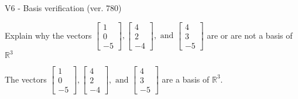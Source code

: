 \begin{exercise}
  \begin{exerciseTitle}V6 - Basis verification (ver. 780)\end{exerciseTitle}
  \begin{exerciseStatement}
    Explain why the vectors \(\left[\begin{array}{r}
1 \\
0 \\
-5
\end{array}\right] , \left[\begin{array}{r}
4 \\
2 \\
-4
\end{array}\right] , \text{ and } \left[\begin{array}{r}
4 \\
3 \\
-5
\end{array}\right]\) are or are not a basis of \(\mathbb{R}^3\)	


  \end{exerciseStatement}
  \begin{exerciseAnswer}
   The vectors \(\left[\begin{array}{r}
1 \\
0 \\
-5
\end{array}\right] , \left[\begin{array}{r}
4 \\
2 \\
-4
\end{array}\right] , \text{ and } \left[\begin{array}{r}
4 \\
3 \\
-5
\end{array}\right]\) 
  	 are  a basis of \(\mathbb{R}^3\).
  


  \end{exerciseAnswer}
\end{exercise}